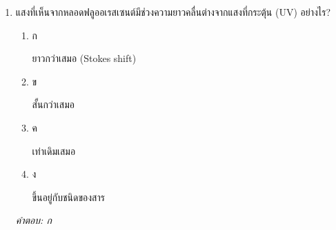 \documentclass[12pt]{article}
\begin{document}
\begin{enumerate}[label=\arabic*., itemsep=0.5\baselineskip, topsep=0.5\baselineskip, leftmargin=*]
\item แสงที่เห็นจากหลอดฟลูออเรสเซนต์มีช่วงความยาวคลื่นต่างจากแสงที่กระตุ้น (UV) อย่างไร?
\begin{enumerate}[label=\alph*)., itemsep=0.3\baselineskip, topsep=0.3\baselineskip]
\item ก\ 
\begin{minipage}[t]{0.9\linewidth}
\raggedright ยาวกว่าเสมอ (Stokes shift)
\end{minipage}
\item ข\ 
\begin{minipage}[t]{0.9\linewidth}
\raggedright สั้นกว่าเสมอ
\end{minipage}
\item ค\ 
\begin{minipage}[t]{0.9\linewidth}
\raggedright เท่าเดิมเสมอ
\end{minipage}
\item ง\ 
\begin{minipage}[t]{0.9\linewidth}
\raggedright ขึ้นอยู่กับชนิดของสาร
\end{minipage}
\end{enumerate}
\vspace{-0.3\baselineskip}
\begin{small}
\textit{คำตอบ: ก}
\end{small}

\end{enumerate}
\end{document}
